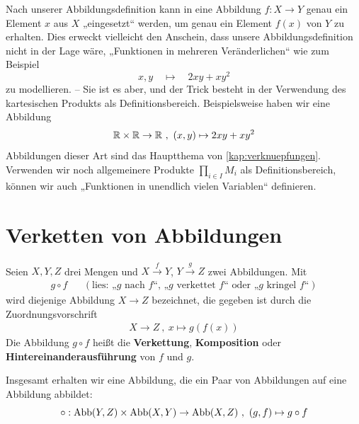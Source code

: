 \begin{bem}
    Nach unserer Abbildungsdefinition kann in eine Abbildung $f:X\to Y$ genau ein Element $x$ aus $X$ „eingesetzt“ werden, um genau ein Element $f(x)$ von $Y$ zu erhalten. Dies erweckt vielleicht den Anschein, dass unsere Abbildungsdefinition nicht in der Lage wäre, „Funktionen in mehreren Veränderlichen“ wie zum Beispiel
        \[ x,y \quad\mapsto\quad 2xy + xy^2 \]
    zu modellieren. -- Sie ist es aber, und der Trick besteht in der Verwendung des kartesischen Produkts als Definitionsbereich. Beispielsweise haben wir eine Abbildung
        \[ \mathbb R \times \mathbb R \to \mathbb R \ ,\ (x,y) \mapsto 2xy +xy^2 \]
    Abbildungen dieser Art sind das Hauptthema von \cref{kap:verknuepfungen}. Verwenden wir noch allgemeinere Produkte $\prod_{i\in I} M_i$ als Definitionsbereich, können wir auch „Funktionen in unendlich vielen Variablen“ definieren.
\end{bem}





\section{Verketten von Abbildungen}


\begin{defin}\label{def:verkettung} 
    Seien $X,Y,Z$ drei Mengen und $X\xrightarrow{f} Y$, $Y \xrightarrow{g} Z$ zwei Abbildungen. Mit
    \begin{align*}
        g\circ f && (\text{lies: „$g$ nach $f$“, „$g$ verkettet $f$“ oder „$g$ kringel $f$“})
    \end{align*}
    wird diejenige Abbildung $X\to Z$ bezeichnet, die gegeben ist durch die Zuordnungsvorschrift
    \begin{align*}
        X \to Z \ ,\ x \mapsto g(f(x))
    \end{align*}
    Die Abbildung $g\circ f$ heißt die \textbf{Verkettung}, \textbf{Komposition} oder \textbf{Hintereinanderausführung} von $f$ und $g$.
    
    Insgesamt erhalten wir eine Abbildung, die ein Paar von Abbildungen auf eine Abbildung abbildet:
        \[ \circ : \operatorname{Abb}(Y,Z)\times \operatorname{Abb}(X,Y) \to \operatorname{Abb}(X,Z) \ ,\ (g,f) \mapsto g\circ f\]
\end{defin}


